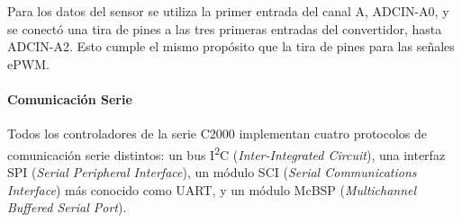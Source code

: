 Para los datos del sensor se utiliza la primer entrada del canal A, ADCIN-A0, y se conectó una tira de pines a las tres primeras entradas del convertidor, hasta ADCIN-A2. Esto cumple el mismo propósito que la tira de pines para las señales ePWM.\\

\paragraph{Comunicación Serie}

Todos los controladores de la serie C2000 implementan cuatro protocolos de comunicación serie distintos: un bus I\textsuperscript{2}C (\textit{Inter-Integrated Circuit}), una interfaz SPI (\textit{Serial Peripheral Interface}), un módulo SCI (\textit{Serial Communications Interface}) más conocido como UART, y un módulo McBSP (\textit{Multichannel Buffered Serial Port}).\\